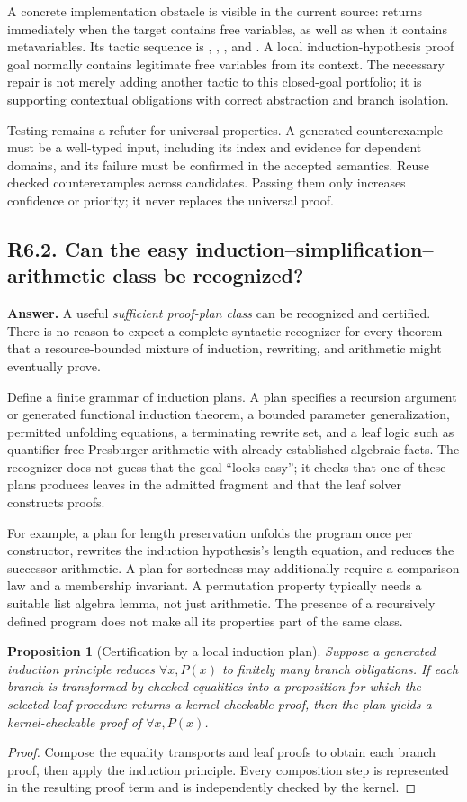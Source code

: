 \documentclass[11pt,a4paper]{article}
\newcommand{\code}[1]{\texttt{\detokenize{#1}}}
\newcommand{\question}[2]{\subsection{#1. #2}\label{q:#1}}
\newtheorem{proposition}[theorem]{Proposition}
\theoremstyle{definition}
\theoremstyle{remark}
\begin{document}
A concrete implementation obstacle is visible in the current source: \code{proofPortfolio} returns immediately when the target contains free variables, as well as when it contains metavariables. Its tactic sequence is \code{rfl}, \code{decide}, \code{simp}, and \code{omega}.\cite{repo-search} A local induction-hypothesis proof goal normally contains legitimate free variables from its context. The necessary repair is not merely adding another tactic to this closed-goal portfolio; it is supporting contextual obligations with correct abstraction and branch isolation.

Testing remains a refuter for universal properties. A generated counterexample must be a well-typed input, including its index and evidence for dependent domains, and its failure must be confirmed in the accepted semantics. Reuse checked counterexamples across candidates. Passing them only increases confidence or priority; it never replaces the universal proof.

\question{R6.2}{Can the easy induction--simplification--arithmetic class be recognized?}

\textbf{Answer.} A useful \emph{sufficient proof-plan class} can be recognized and certified. There is no reason to expect a complete syntactic recognizer for every theorem that a resource-bounded mixture of induction, rewriting, and arithmetic might eventually prove.

Define a finite grammar of induction plans. A plan specifies a recursion argument or generated functional induction theorem, a bounded parameter generalization, permitted unfolding equations, a terminating rewrite set, and a leaf logic such as quantifier-free Presburger arithmetic with already established algebraic facts. The recognizer does not guess that the goal ``looks easy''; it checks that one of these plans produces leaves in the admitted fragment and that the leaf solver constructs proofs.

For example, a plan for length preservation unfolds the program once per constructor, rewrites the induction hypothesis's length equation, and reduces the successor arithmetic. A plan for sortedness may additionally require a comparison law and a membership invariant. A permutation property typically needs a suitable list algebra lemma, not just arithmetic. The presence of a recursively defined program does not make all its properties part of the same class.

\begin{proposition}[Certification by a local induction plan]\label{prop:proofplan}
Suppose a generated induction principle reduces $\forall x, P(x)$ to finitely many branch obligations. If each branch is transformed by checked equalities into a proposition for which the selected leaf procedure returns a kernel-checkable proof, then the plan yields a kernel-checkable proof of $\forall x,P(x)$.
\end{proposition}
\begin{proof}
Compose the equality transports and leaf proofs to obtain each branch proof, then apply the induction principle. Every composition step is represented in the resulting proof term and is independently checked by the kernel.
\end{proof}
\end{document}
